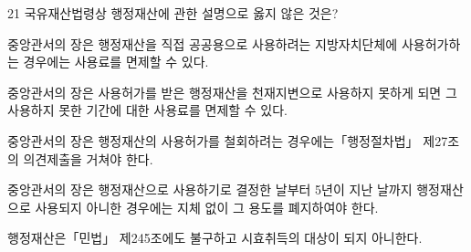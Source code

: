 \begin{question}{21}
국유재산법령상 행정재산에 관한 설명으로 옳지 않은 것은?
\begin{choices}
  \item 중앙관서의 장은 행정재산을 직접 공공용으로 사용하려는 지방자치단체에 사용허가하는 경우에는 사용료를 면제할 수 있다.
  \item 중앙관서의 장은 사용허가를 받은 행정재산을 천재지변으로 사용하지 못하게 되면 그 사용하지 못한 기간에 대한 사용료를 면제할 수 있다.
  \item 중앙관서의 장은 행정재산의 사용허가를 철회하려는 경우에는「행정절차법」 제27조의 의견제출을 거쳐야 한다.
  \item 중앙관서의 장은 행정재산으로 사용하기로 결정한 날부터 5년이 지난 날까지 행정재산으로 사용되지 아니한 경우에는 지체 없이 그 용도를 폐지하여야 한다.
  \item 행정재산은「민법」 제245조에도 불구하고 시효취득의 대상이 되지 아니한다.
\end{choices}
\end{question}

